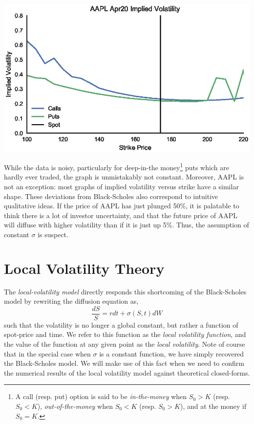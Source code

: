 \documentclass[12pt]{article}
\numberwithin{equation}{section}
\begin{document}
\begin{center}
\includegraphics{figs/aapliv}
\end{center}

While the data is noisy, particularly for deep-in-the money\footnote{A call
(resp. put) option is said to be \emph{in-the-money} when $S_0 > K$ (resp. $S_0
< K$), \emph{out-of-the-money} when $S_0 < K$ (resp. $S_0 > K$), and at the
money if $S_0 = K$.} puts which are hardly ever traded, the graph is
unmistakably not constant. Moreover, AAPL is not an exception: most graphs of
implied volatility versus strike have a similar shape. These deviations from
Black-Scholes also correspond to intuitive qualitative ideas. If the price of
AAPL has just plunged 50\%, it is palatable to think there is a lot of investor
uncertainty, and that the future price of AAPL will diffuse with higher
volatility than if it is just up 5\%.  Thus, the assumption of constant $\sigma$
is suspect.

\section{Local Volatility Theory}
\label{sec:localvoltheory}

The \emph{local-volatility model} directly responds this shortcoming of the
Black-Scholes model by rewriting the diffusion equation as,
\begin{equation}
 \frac{dS}{S} = r dt + \sigma(S,t) dW 
\end{equation}
such that the volatility is no longer a global constant, but rather a function
of spot-price and time. We refer to this function as the \emph{local volatility
function}, and the value of the function at any given point as the \emph{local
volatility}. Note of course that in the special case when $\sigma$ is a constant
function, we have simply recovered the Black-Scholes model. We will make use of
this fact when we need to confirm the numerical results of the local volatility
model against theoretical closed-forms.
\end{document}
